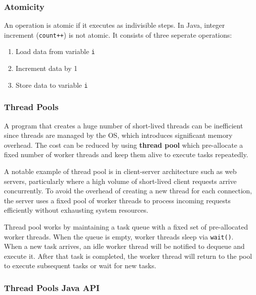 \documentclass[11pt,a4paper]{article}
\begin{document}
\subsubsection{Atomicity}

\noindent An operation is atomic if it executes as indivisible steps. 
In Java, integer increment (\texttt{count++}) is not atomic. It consists of three seperate operations:

\begin{enumerate}
    \item Load data from variable \texttt{i}
    \item Increment data by 1
    \item Store data to variable \texttt{i}
\end{enumerate}

\subsubsection{Thread Pools}

\noindent A program that creates a huge number of short-lived threads can be inefficient since threads are managed by the OS, which introduces significant memory overhead.
The cost can be reduced by using \textbf{thread pool} which pre-allocate a fixed number of worker threads and keep them alive to execute tasks repeatedly.

\hspace{5pt}

\noindent A notable example of thread pool is in client-server architecture such as web servers, particularly where a high volume of short-lived client requests arrive concurrently.
To avoid the overhead of creating a new thread for each connection, the server uses a fixed pool of worker threads to process incoming requests efficiently without exhausting system resources.

\hspace{5pt}

\noindent Thread pool works by maintaining a task queue with a fixed set of pre-allocated worker threads. 
When the queue is empty, worker threads sleep via \texttt{wait()}.
When a new task arrives, an idle worker thread will be notified to dequeue and execute it.
After that task is completed, the worker thread will return to the pool to execute subsequent tasks or wait for new tasks.

\subsubsection*{Thread Pools Java API}
\end{document}
